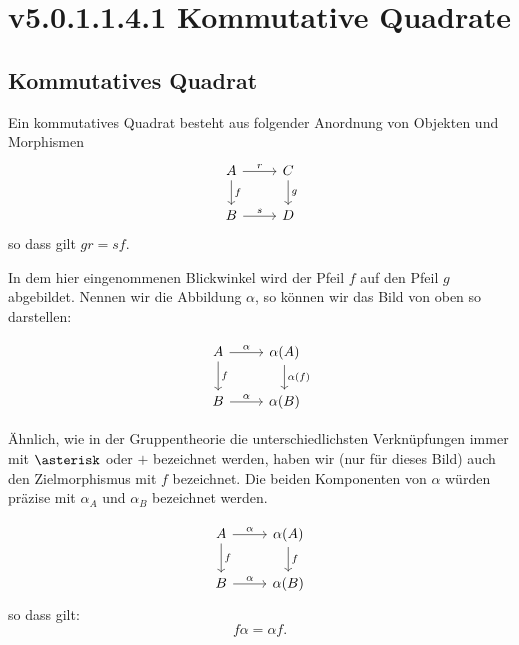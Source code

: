 \documentclass[a4paper]{amsart}
\theoremstyle{definition}
\begin{document}
\section{v5.0.1.1.4.1 Kommutative Quadrate}

\subsection{Kommutatives Quadrat }
Ein kommutatives Quadrat besteht aus folgender Anordnung von Objekten und Morphismen
\begin{equation}
    \begin{tikzcd}
        A   \arrow[d, "f"]  \arrow[r, "r"] & C \arrow[d, "g"]\\
        B                   \arrow[r, "s"] & D
    \end{tikzcd}
\end{equation}
so dass gilt $gr = sf$.

In dem hier eingenommenen Blickwinkel wird der Pfeil $f$ auf den Pfeil $g$ abgebildet. Nennen wir die Abbildung $\alpha$, so können wir das Bild von oben so darstellen:

\begin{equation}
    \begin{tikzcd}
        A   \arrow[d, "f"]  \arrow[r, "\alpha"] & \alpha(A) \arrow[d, "\alpha(f)"]\\
        B                   \arrow[r, "\alpha"] & \alpha(B)
    \end{tikzcd}
\end{equation}

Ähnlich, wie in der Gruppentheorie die unterschiedlichsten Verknüpfungen immer mit $\asterisk$ oder $+$ bezeichnet werden, haben wir (nur für dieses Bild) auch den Zielmorphismus mit $f$ bezeichnet. Die beiden Komponenten von $\alpha$ würden präzise mit $\alpha_A$ und $\alpha_B$ bezeichnet werden.

\begin{equation}
    \begin{tikzcd}
        A   \arrow[d, "f"]  \arrow[r, "\alpha"] & \alpha(A) \arrow[d, "f"]\\
        B                   \arrow[r, "\alpha"] & \alpha(B)
    \end{tikzcd}
\end{equation}
so dass gilt:
\begin{equation}
    f\alpha = \alpha f.
\end{equation}
\end{document}
